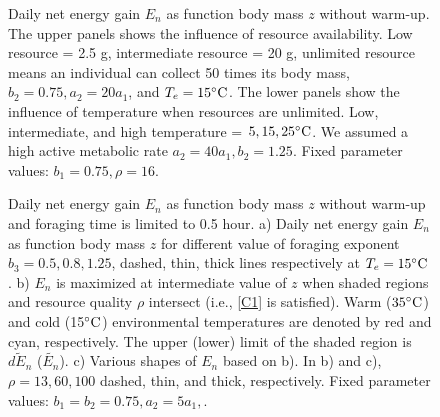 \begin{figure}[H]
\begin{center}
\caption{
      Daily net energy gain  $E_n$ as function body mass $z$ without warm-up.
	The upper panels shows the influence of resource availability.
	Low resource = 2.5 g, intermediate resource = 20 g, unlimited resource means an individual can collect 50 times its body mass, $b_2 = 0.75, a_2 = 20 a_1$, and $T_e = 15 ^{\circ} \rm{C}$. 
	The lower panels show the influence of temperature when resources are unlimited.
	Low, intermediate, and high temperature = $5, 15, 25 ^{\circ} \rm{C}$.
	We assumed a high active metabolic rate $a_2 = 40 a_1, b_2  = 1.25$.
	Fixed parameter values: $b_1 = 0.75, \rho = 16$.
}
\label{fig2}
\end{center}
\end{figure}
\newpage
%
\begin{figure}[H]
\begin{center}
\caption{
	 Daily net energy gain  $E_n$ as function body mass $z$ without warm-up and foraging time is limited to 0.5 hour.
	a) Daily net energy gain  $E_n$ as function body mass $z$ for different value of foraging exponent $b_3 = 0.5, 0.8, 1.25$, dashed, thin, thick lines respectively  at $T_e  = 15 ^{\circ} \rm{C}$.
	b) $E_n$ is maximized at intermediate value of $z$  when shaded regions and resource quality $\rho$ intersect (i.e., \cref{C1} is satisfied).
	Warm ($35^{\circ} \rm{C}$) and cold (15$^{\circ} \rm{C}$) environmental temperatures are denoted by red and cyan, respectively.
	The upper (lower) limit of the shaded region is $\widetilde{dE_n}$ ($\widetilde{E_n}$).  
	c) Various shapes of $E_n$ based on b).
	In b) and c), $\rho = 13, 60, 100$ dashed, thin, and thick, respectively.
	Fixed parameter values: $b_1 = b_2 = 0.75, a_2 = 5 a_1, $.
}
\label{fig3}
\end{center}
\end{figure}
